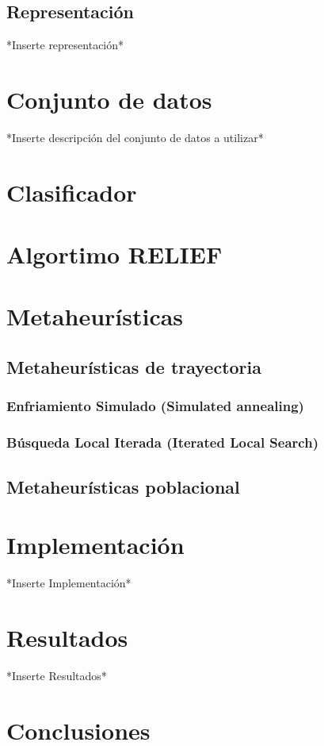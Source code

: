 \documentclass{ci5652}
\begin{document}
\subsection{Representación}
*Inserte representación*

\section{Conjunto de datos}
*Inserte descripción del conjunto de datos a utilizar*

\section{Clasificador}

\section{Algortimo RELIEF}


\section{Metaheurísticas}
\subsection{Metaheurísticas de trayectoria}
\subsubsection{Enfriamiento Simulado (Simulated annealing)}
\subsubsection{Búsqueda Local Iterada (Iterated Local Search)}
\subsection{Metaheurísticas poblacional}

\section{Implementación}
*Inserte Implementación*

\section{Resultados}
*Inserte Resultados*

\section*{Conclusiones}
\end{document}
